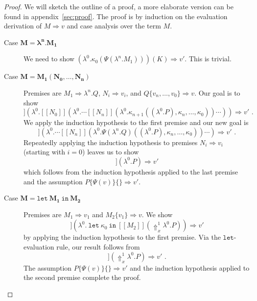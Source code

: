\documentclass[a4paper,11pt,draft]{article}
\newcommand{\kw}[1]{\mathtt{#1}}
\begin{document}
\begin{proof}
We will sketch the outline of a proof, a more elaborate version can be found in
appendix~\ref{sec:proof}. The proof is by induction on the evaluation derivation
of $M \Rightarrow v$ and case analysis over the term $M$.
\begin{description}
\item[\sffamily Case $\boldsymbol{M = \lambda^{n}.M_{1}}$]\quad
  We need to show
  $(\lambda^{0}.\kappa_{0}(\Psi(\lambda^{n}.M_{1}))) (K) \Rightarrow v'$.
  This is trivial.
\item[\sffamily Case $\boldsymbol{M = M_{1}(N_{0}, \ldots, N_{n})}$]\quad
  Premises are $M_{1} \Rightarrow \lambda^{n}.Q$, $N_{i} \Rightarrow v_{i}$,
  and $Q\{v_{n}, \ldots, v_{0}\} \Rightarrow v$. Our goal is to show
  \begin{equation*}
    [\![M_{1}]\!]
    (\lambda^{0}.[\![N_{0}]\!](\lambda^{0}. \cdots
    [\![N_{n}]\!](\lambda^{0}.\kappa_{n+1}((\lambda^{0}.P), \kappa_{n},
    \ldots, \kappa_{0})) \cdots ))
    \Rightarrow v' \text{ .}
  \end{equation*}
  We apply the induction hypothesis to the first premise and our new goal is
  \begin{equation*}
    [\![N_{0}]\!]
    (\lambda^{0}. \cdots [\![N_{n}]\!](\lambda^{0}.\Psi(\lambda^{n}.Q)
    ((\lambda^{0}.P), \kappa_{n}, \ldots, \kappa_{0})) \cdots )
    \Rightarrow v' \text{ .}
  \end{equation*}
  Repeatedly applying the induction hypothesis to premises
  $N_{i} \Rightarrow v_{i}$ (starting with $i=0$) leaves us to show
  \begin{equation*}
    [\![Q\{v_{n}, \ldots, v_{0}\}]\!] (\lambda^{0}.P) \Rightarrow v'
  \end{equation*}
  which follows from the induction hypothesis applied to the last premise and
  the assumption $P\{\Psi(v)\}\{\} \Rightarrow v'$.
\item[\sffamily Case $\boldsymbol{M = \kw{let} \: M_{1} \: \kw{in} \: M_{2}}$]\quad
  Premises are $M_{1} \Rightarrow v_{1}$ and $M_{2}\{v_{1}\} \Rightarrow v$.
  We show
  \begin{equation*}
    [\![M_{1}]\!]
    (\lambda^{0}. \: \kw{let} \: \kappa_{0} \: \kw{in} \: [\![M_{2}]\!]
    (\Uparrow_{x}^{1} \lambda^{0}.P)) \Rightarrow v'
  \end{equation*}
  by applying the induction hypothesis to the first premise. Via the
  $\kw{let}$-evaluation rule, our result follows from
  \begin{equation*}
    [\![M_{2}\{v_{1}\}]\!] (\Uparrow_{x}^{1} \lambda^{0}.P)
    \Rightarrow v' \text{ .}
  \end{equation*}
  The assumption $P\{\Psi(v)\}\{\} \Rightarrow v'$ and the induction hypothesis
  applied to the second premise complete the proof.\qedhere
\end{description}
\end{proof}
\end{document}
